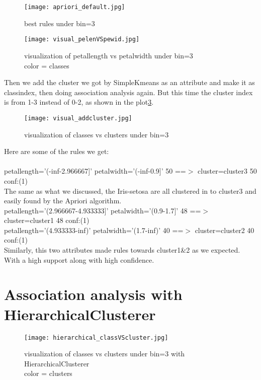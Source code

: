 \documentclass{article}
\begin{document}
\begin{figure}[H]
\centering
\texttt{[image: apriori\_default.jpg]}
\caption{\label{fig:apriori_default}best rules under bin=3}
\end{figure}

\begin{figure}[H]
\centering
\texttt{[image: visual\_pelenVSpewid.jpg]}
\caption{\label{fig:visual_pelenVSpewid}visualization of petallength vs petalwidth under bin=3\\ color = classes}
\end{figure}

Then we add the cluster we got by SimpleKmeans as an attribute and make it as classindex, then doing association analysis again. But this time the cluster index is from 1-3 instead of 0-2, as shown in the plot\ref{fig:visual_addcluster}.


\begin{figure}[H]
\centering
\texttt{[image: visual\_addcluster.jpg]}
\caption{\label{fig:visual_addcluster}visualization of classes vs clusters under bin=3}
\end{figure}


Here are some of the rules we get:\\
\\
petallength='(-inf-2.966667]' petalwidth='(-inf-0.9]' 50 ==$>$ cluster=cluster3 50    conf:(1)\\


The same as what we discussed, the Iris-setosa are all clustered in to cluster3 and easily found by the Apriori algorithm.
\\
petallength='(2.966667-4.933333]' petalwidth='(0.9-1.7]' 48 ==$>$ cluster=cluster1 48    conf:(1)\\
petallength='(4.933333-inf)' petalwidth='(1.7-inf)' 40 ==$>$ cluster=cluster2 40    conf:(1)\\

Similarly, this two attributes made rules towards cluster1\&2 as we expected. With a high support along with high confidence.

\section{Association analysis with HierarchicalClusterer }

\begin{figure}[H]
\centering
\texttt{[image: hierarchical\_classVScluster.jpg]}
\caption{\label{fig:hierarchical_classVScluster}visualization of classes vs clusters under bin=3 with HierarchicalClusterer\\color = clusters}
\end{figure}
\end{document}
